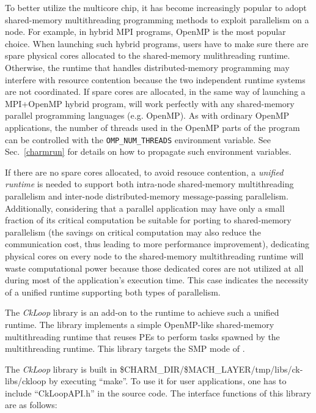 To better utilize the multicore chip, it has become increasingly popular to
adopt shared-memory multithreading programming methods to exploit parallelism
on a node. For example, in hybrid MPI programs, OpenMP is the most popular
choice.  When launching such hybrid programs, users have to make sure there are
spare physical cores allocated to the shared-memory mulithreading runtime.
Otherwise, the runtime that handles distributed-memory programming may
interfere with resource contention because the two independent runtime systems
are not coordinated.  If spare cores are allocated, in the same way of
launching a MPI+OpenMP hybrid program, \charmpp{} will work perfectly with any
shared-memory parallel programming languages (e.g. OpenMP). As with ordinary
OpenMP applications, the number of threads used in the OpenMP parts of the
program can be controlled with the {\tt OMP\_NUM\_THREADS} environment
variable.  See Sec.~\ref{charmrun} for details on how to propagate such
environment variables.

If there are no spare cores allocated, to avoid resouce contention, a
\emph{unified runtime} is needed to support both intra-node shared-memory
multithreading parallelism and inter-node distributed-memory
message-passing parallelism. Additionally, considering that a parallel
application may have only a small fraction of its critical computation be
suitable for porting to shared-memory parallelism (the savings on critical
computation may also reduce the communication cost, thus leading to more
performance improvement), dedicating physical cores on every node to the
shared-memory multithreading runtime will waste computational power because
those dedicated cores are not utilized at all during most of the application's
execution time. This case indicates the necessity of a unified
runtime supporting both types of parallelism.

The \emph{CkLoop} library is an add-on to the \charmpp{} runtime to achieve such
a unified runtime.  The library implements a simple OpenMP-like shared-memory
multithreading runtime that reuses \charmpp{} PEs to perform tasks spawned by
the multithreading runtime. This library targets the SMP mode of \charmpp{}.

The \emph{CkLoop} library is built in
\$CHARM\_DIR/\$MACH\_LAYER/tmp/libs/ck-libs/ckloop by executing ``make''.
To use it for user applications, one has to include ``CkLoopAPI.h'' in
the source code. The interface functions of this library are as
follows:


